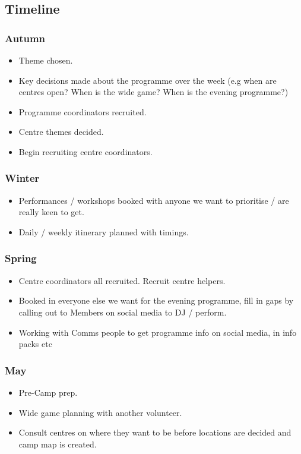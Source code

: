 \subsection{Timeline}
\subsubsection{Autumn}
\begin{itemize}
    \item Theme chosen. 
    \item Key decisions made about the programme over the week (e.g when are centres open? When is the wide game? When is the evening programme?)
    \item Programme coordinators recruited. 
    \item Centre themes decided. 
    \item Begin recruiting centre coordinators. 
\end{itemize}
\subsubsection{Winter}
\begin{itemize}
    \item Performances / workshops booked with anyone we want to prioritise / are really keen to get.
    \item Daily / weekly itinerary planned with timings.
\end{itemize}

\subsubsection{Spring}
\begin{itemize}
    \item Centre coordinators all recruited. Recruit centre helpers.
    \item Booked in everyone else we want for the evening programme, fill in gaps by calling out to Members on social media to DJ / perform.
    \item Working with Comms people to get programme info on social media, in info packs etc
\end{itemize}
\subsubsection{May}
\begin{itemize}
    \item Pre-Camp prep.
    \item Wide game planning with another volunteer.
    \item Consult centres on where they want to be before locations are decided and camp map is created.    
\end{itemize}
